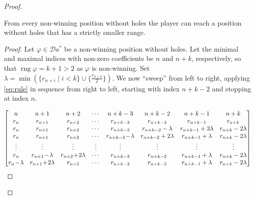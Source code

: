 \documentclass[a4paper, UKenglish, numberwithinsect, thm-restate, cleveref, final]{lipics-v2021}
\theoremstyle{plain}
\theoremstyle{definition}
\newcommand{\rn}[2]{\tikz[remember picture,baseline=(#1.base)]\node [inner sep=0] (#1) {$#2$};}
\DeclareMathOperator{\rng}{rng}
\numberwithin{equation}{section}
\begin{document}
\begin{proof}
  \begin{lemma}[Sweeping]\label{lem:sweeping}
    From every non-winning position without holes the player can reach a position without holes that has a strictly smaller range.
  \end{lemma}

\begin{proof}
  Let \(\varphi \in \mathcal{D} a^{*}\) be a non-winning position without holes.
  Let the minimal and maximal indices with non-zero coefficients be \(n \) and \(n+k\), respectively, so that \(\rng \varphi = k+1 > 2\) as \(\varphi\) is non-winning.
  Set \(\lambda = \min(\{ r_{n+i} \mid i < k\} \cup \{\frac{r_{n+k}}{2}\})\).
  We now ``sweep'' from left to right, applying \eqref{eq:rule} in sequence from right to left, starting with index \(n+k-2\) and stopping at index \(n\).
  {
    \[
      \begin{bmatrix}
        n     & n+1    & n+2    & \cdots &  n+k-3    & n+k-2     & n+k-1    &  n+k     \\
        r_{n} & r_{n+1} & r_{n+2} & \cdots & r_{n+k-3} & \rn{1lu}{r_{n+k-2}} & {r_{n+k-1}} & \rn{1ru}{r_{n+k}} \\
        r_{n} & r_{n+1} & r_{n+2} & \cdots & \rn{2lu}{r_{n+k-3}} & r_{n+k-2} - \lambda & \rn{1ld}{r_{n+k-1}} + \rn{1rd}{3 \lambda} & {r_{n+k} - 2 \lambda} \\
        r_{n} & r_{n+1} & r_{n+2} & \cdots & r_{n+k-3}\!-\!\lambda & \rn{2ld}{r_{n+k-2}} + \rn{2rd}{2 \lambda} & r_{n+k-1} +  \lambda & r_{n+k} - 2 \lambda \\
        \vdots & \rn{4lu}{\vdots} & \vdots & \rn{4ru}{\vdots} & \rn{3rd}{\vdots } & \vdots & \vdots & \vdots \\
        \rn{5lu}{r_{n}} & r_{n+1} \!-\!\lambda & \rn{4ld}{r_{n+2}}\! +\! \rn{4rd}{2 \lambda} & \cdots & r_{n+k-3} & r_{n+k-2} & r_{n+k-1} +  \lambda & r_{n+k} - 2 \lambda \\
        r_{n}\! -\! \lambda & \rn{5d}{r_{n+1}\! +\! 2 \lambda} & r_{n+2} & \cdots & r_{n+k-3} & r_{n+k-2} & r_{n+k-1} +  \lambda & r_{n+k} - 2 \lambda \\
      \end{bmatrix}
    \]
    }
\end{proof}
\end{proof}
\end{document}
